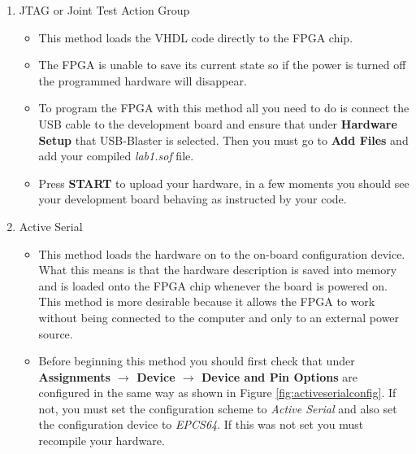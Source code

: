 \begin{enumerate}

	\item JTAG or Joint Test Action Group

	\begin{itemize}
	
		\item This method loads the VHDL code directly to the FPGA chip.
		
		\item The FPGA is unable to save its current state so if the power is turned off the programmed hardware will disappear.
		
		\item To program the FPGA with this method all you need to do is connect the USB cable to the development board and ensure that under {\bf Hardware Setup} that USB-Blaster is selected. Then you must go to {\bf Add Files} and add your compiled \emph{lab1.sof} file.
		
		\item Press {\bf START} to upload your hardware, in a few moments you should see your development board behaving as instructed by your code.
		
	\end{itemize}

\item Active Serial

	\begin{itemize}
		\item This method loads the hardware on to the on-board configuration device. What this means is that the hardware description is saved into memory and is loaded onto the FPGA chip whenever the board is powered on. This method is more desirable because it allows the FPGA to work without being connected to the computer and only to an external power source.
		
		\item Before beginning this method you should first check that under {\bf Assignments $\rightarrow$ Device $\rightarrow$ Device and Pin Options} are configured in the same way as shown in Figure \ref{fig:activeserialconfig}. If not, you must set the configuration scheme to \emph{Active Serial} and also set the configuration device to \emph{EPCS64}. If this was not set you must recompile your hardware.


\end{itemize}
\end{enumerate}
